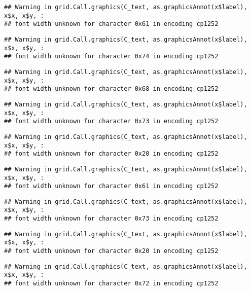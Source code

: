 \documentclass[
]{article}
\begin{document}
\begin{verbatim}
## Warning in grid.Call.graphics(C_text, as.graphicsAnnot(x$label), x$x, x$y, :
## font width unknown for character 0x61 in encoding cp1252
\end{verbatim}

\begin{verbatim}
## Warning in grid.Call.graphics(C_text, as.graphicsAnnot(x$label), x$x, x$y, :
## font width unknown for character 0x74 in encoding cp1252
\end{verbatim}

\begin{verbatim}
## Warning in grid.Call.graphics(C_text, as.graphicsAnnot(x$label), x$x, x$y, :
## font width unknown for character 0x68 in encoding cp1252
\end{verbatim}

\begin{verbatim}
## Warning in grid.Call.graphics(C_text, as.graphicsAnnot(x$label), x$x, x$y, :
## font width unknown for character 0x73 in encoding cp1252
\end{verbatim}

\begin{verbatim}
## Warning in grid.Call.graphics(C_text, as.graphicsAnnot(x$label), x$x, x$y, :
## font width unknown for character 0x20 in encoding cp1252
\end{verbatim}

\begin{verbatim}
## Warning in grid.Call.graphics(C_text, as.graphicsAnnot(x$label), x$x, x$y, :
## font width unknown for character 0x61 in encoding cp1252
\end{verbatim}

\begin{verbatim}
## Warning in grid.Call.graphics(C_text, as.graphicsAnnot(x$label), x$x, x$y, :
## font width unknown for character 0x73 in encoding cp1252
\end{verbatim}

\begin{verbatim}
## Warning in grid.Call.graphics(C_text, as.graphicsAnnot(x$label), x$x, x$y, :
## font width unknown for character 0x20 in encoding cp1252
\end{verbatim}

\begin{verbatim}
## Warning in grid.Call.graphics(C_text, as.graphicsAnnot(x$label), x$x, x$y, :
## font width unknown for character 0x72 in encoding cp1252
\end{verbatim}
\end{document}
